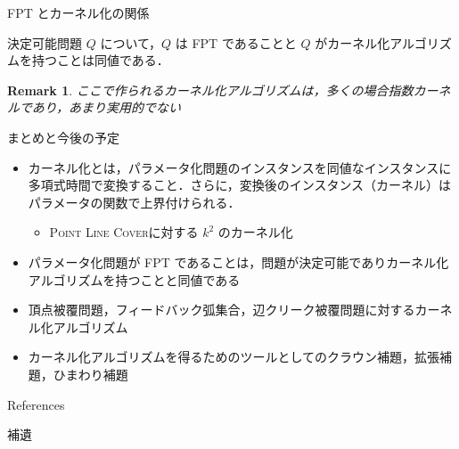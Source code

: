 \documentclass[
  aspectratio=169,
]{beamer}
\newcommand{\FPT}{{\upshape FPT}\xspace}
\newtheorem{remark}{Remark}
\DeclareRobustCommand{\PLC}{\textnormal{\textsc{Point Line Cover}}}
\begin{document}
\begin{frame}{\FPT とカーネル化の関係}

	\begin{theorem}
		決定可能問題 \(Q\) について，\(Q\) は \FPT であることと \(Q\) がカーネル化アルゴリズムを持つことは同値である．
	\end{theorem}


	\begin{remark}
		ここで作られるカーネル化アルゴリズムは，多くの場合指数カーネルであり，あまり実用的でない
	\end{remark}
\end{frame}

\begin{frame}{まとめと今後の予定}
	\begin{itemize}
		\item \alert{カーネル化}とは，パラメータ化問題のインスタンスを同値なインスタンスに多項式時間で変換すること．さらに，変換後のインスタンス（カーネル）はパラメータの関数で上界付けられる．
		      \begin{itemize}
			      \item \PLC に対する \(k^2\) のカーネル化
		      \end{itemize}
		\item パラメータ化問題が \FPT であることは，問題が決定可能でありカーネル化アルゴリズムを持つことと同値である
	\end{itemize}

	\begin{itemize}
		\item 頂点被覆問題，フィードバック弧集合，辺クリーク被覆問題に対するカーネル化アルゴリズム
		\item カーネル化アルゴリズムを得るためのツールとしてのクラウン補題，拡張補題，ひまわり補題
	\end{itemize}
\end{frame}

\begin{frame}[allowframebreaks]{References}
	\printbibliography[heading=none]{}
\end{frame}

\begin{frame}{補遺}
\end{frame}
\end{document}
